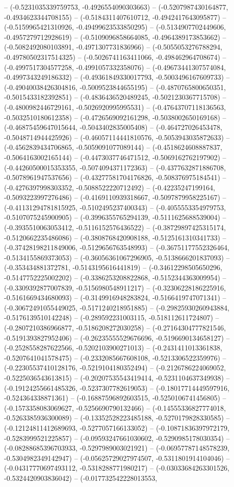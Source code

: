 -- (-0.5231035339759753, -0.4926554090303663) -- (-0.5207987430164877, -0.4934623344708155) -- (-0.5184311407610712, -0.4942417643095877) -- (-0.5159965421310926, -0.49499623533850295) -- (-0.5134907702449606, -0.4957279712928619) -- (-0.5109096858664085, -0.4964389173853662) -- (-0.5082492080103891, -0.4971307731836966) -- (-0.5055053276788294, -0.49780502317514325) -- (-0.5026741163411066, -0.498462964708674) -- (-0.4997517304577258, -0.4991057332358076) -- (-0.49673441307574084, -0.4997343249186332) -- (-0.49361849330017793, -0.5003496167609733) -- (-0.49040038426304816, -0.5009523844655195) -- (-0.4870765800650351, -0.5015433182392851) -- (-0.4836436520489245, -0.5021230367715708) -- (-0.4800982446729161, -0.5026920995995531) -- (-0.47643707118136563, -0.5032510180612358) -- (-0.4726569092161298, -0.5038002650169168) -- (-0.46875459647015644, -0.5043402835005408) -- (-0.464727026453478, -0.5048714944425926) -- (-0.46057114441810576, -0.5053943035872633) -- (-0.4562839434706865, -0.5059091077089144) -- (-0.4518624608887837, -0.5064163002165144) -- (-0.4473037746471512, -0.5069162762197902) -- (-0.44260500015353355, -0.5074094371172363) -- (-0.4377632871886708, -0.5078961947537656) -- (-0.43277581704176826, -0.508376975184541) -- (-0.4276397998303352, -0.5088522220712492) -- (-0.42235247199164, -0.5093223997276486) -- (-0.4169110939318667, -0.5097879958225167) -- (-0.41131294781815925, -0.5102495237400343) -- (-0.4055553354979753, -0.5107075245900905) -- (-0.3996355765294139, -0.5111625688539004) -- (-0.3935510063053412, -0.5116152576436522) -- (-0.38729897425315174, -0.5120662235486086) -- (-0.3808768420908188, -0.5125161310341733) -- (-0.37428198211849006, -0.5129656763548993) -- (-0.36751177552326464, -0.5134155869373053) -- (-0.36056361067296905, -0.5138666201837093) -- (-0.353434881372781, -0.5143195616441819) -- (-0.34612298505650296, -0.5147752225002202) -- (-0.3386253208822868, -0.5152344363009954) -- (-0.3309392877007839, -0.5156980548911217) -- (-0.32306228186225916, -0.5161669434680093) -- (-0.3149916948283824, -0.5166419747071341) -- (-0.30672491055449025, -0.5171240218951885) -- (-0.29825930260943884, -0.5176139510142248) -- (-0.289592231003115, -0.518112611724807) -- (-0.2807210386966877, -0.5186208272030258) -- (-0.27164304777821546, -0.5191393827952406) -- (-0.26235555529676696, -0.5196690134658127) -- (-0.2528558287622566, -0.5202103900271013) -- (-0.2431411013361838, -0.5207641041578475) -- (-0.2332085667608108, -0.5213306522359976) -- (-0.22305537410128176, -0.5219104180352494) -- (-0.2126786224069052, -0.5225036543613815) -- (-0.20207535543419414, -0.5231104637349938) -- (-0.19124255661485326, -0.5237307782619053) -- (-0.18017714449597916, -0.524364338871361) -- (-0.16887596892603515, -0.5250106741456805) -- (-0.1573358083069627, -0.5256690790132466) -- (-0.14555336827774018, -0.5263385936300089) -- (-0.13352528223485188, -0.5270179828330585) -- (-0.12124811412689693, -0.5277057166133052) -- (-0.10871836397972179, -0.5283999521225857) -- (-0.09593247661030602, -0.5290985178030354) -- (-0.08288685396703933, -0.5297989003021921) -- (-0.06957787148578239, -0.5304982349142947) -- (-0.05625729027974507, -0.5311801914104046) -- (-0.04317770697493112, -0.5318288771980217) -- (-0.03033684263301526, -0.5324420903836042) -- (-0.017732542228013553, 